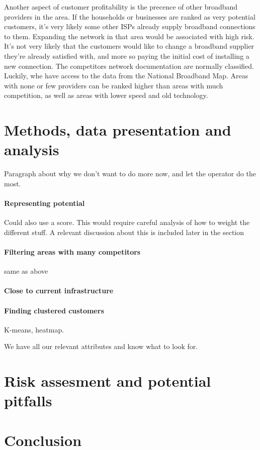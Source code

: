 \documentclass[twocolumn]{article}
\begin{document}
Another aspect of customer profitability is the precence of other broadband providers in the area. If the households or businesses are ranked as very potential customers, it's very likely some other ISPs already supply broadband connections to them. Expanding the network in that area would be associated with high risk. It's not very likely that the customers would like to change a broadband supplier they're already satisfied with, and more so paying the initial cost of installing a new connection. The competitors network documentation are normally classified. Luckily, whe have access to the data from the National Broadband Map. Areas with none or few providers can be ranked higher than areas with much competition, as well as areas with lower speed and old technology.

\section{Methods, data presentation and analysis}
\label{sec:Methods}
Paragraph about why we don't want to do more now, and let the operator do the most.



\paragraph{Representing potential}
\label{par:Representing potetnial}


Could also use a score. This would require careful analysis of how to weight the different stuff. A relevant discussion about this is included later in the section

\paragraph{Filtering areas with many competitors}
\label{par:Filtering areas with many competitors}
same as above

\paragraph{Close to current infrastructure}
\label{par:Close to current infrastructure}

\paragraph{Finding clustered customers}
\label{par:Finding clustered customers}
K-means, heatmap.



We have all our relevant attributes and know what to look for. 


\section{Risk assesment and potential pitfalls}
\label{sec:Risk assesment and potential pitfalls}


\section{Conclusion}
\label{sec:Conclusion}

\printbibliography
\end{document}
